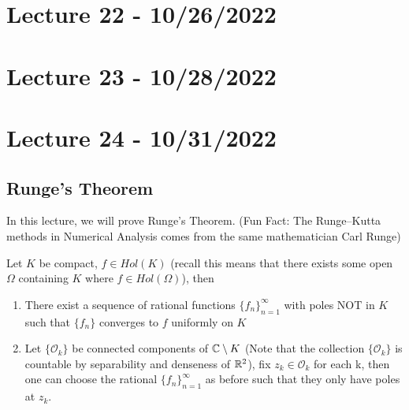 \documentclass{article}
\begin{document}
\section{Lecture 22 - 10/26/2022}

\section{Lecture 23 - 10/28/2022}

\newpage
\section{Lecture 24 - 10/31/2022}

\subsection{Runge's Theorem}

In this lecture, we will prove Runge's Theorem. (Fun Fact: The Runge–Kutta methods in Numerical Analysis comes from the same mathematician Carl Runge)

\begin{theorem}
    Let $K$ be compact, $f \in Hol(K)$ (recall this means that there exists some open $\Omega$ containing $K$ where $f \in Hol(\Omega)$), then
    \begin{enumerate}
        \item There exist a sequence of rational functions $\{f_n\}_{n = 1}^\infty$ with poles NOT in $K$ such that $\{f_n\}$ converges to $f$ uniformly on $K$
        \item Let $\{\mathcal{O}_k\}$ be connected components of $\mathbb{C} \setminus K$ (Note that the collection $\{\mathcal{O}_k\}$ is countable by separability and denseness of $\mathbb{R}^2$), fix $z_k \in \mathcal{O}_k$ for each k, then one can choose the rational $\{f_n\}_{n = 1}^\infty$ as before such that they only have poles at $z_k$.
    \end{enumerate}
\end{theorem}
\end{document}
